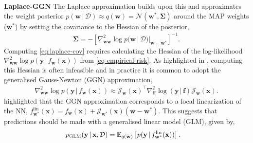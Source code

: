 \documentclass{article}
\newcommand{\weights}{\ensuremath{\mathbf{w}}}
\newcommand{\mbf}[1]{\mathbf{#1}}
\renewcommand{\mid}{\,|\,}
\newcommand{\vf}{\mbf{f}}
\newcommand{\vx}{\mbf{x}}
\newcommand{\vy}{\mbf{y}}
\newcommand{\vw}{\mbf{w}}
\newcommand{\Jac}[2]{\mathcal{J}_{#1}(#2)}
\begin{document}
\textbf{Laplace-GGN}
The Laplace approximation \citet{aa} builds upon this and approximates the weight posterior $p(\vw \mid \mathcal{D}) \approx q(\vw)= \mathcal{N}(\vw^{*} , \bm\Sigma)$
around the MAP weights ($\vw^{*}$) by setting the covariance to the Hessian of the posterior,
\begin{align} \label{eq:laplace-cov}
 \bm\Sigma = - \left[\nabla^{2}_{\vw\vw} \log p(\vw \mid \mathcal{D})  |_{\vw=\vw^{*}} \right]^{-1}.
\end{align}
Computing \cref{eq:laplace-cov} requires calculating the Hessian of the log-likelihood $\nabla^{2}_{\vw\vw} \log p(\vy \mid f_{\vw}(\vx))$ from \cref{eq-empirical-risk}.
As highlighted in \citet{immer2021improving}, computing this Hessian is often infeasible and in practice it is common to adopt the
generalised Gauss-Newton (GGN) approximation,
\begin{align}
 \nabla^{2}_{\vw\vw} \log p(\vy \mid f_{\vw}(\vx)) \approx \Jac{\vw}{\vx}^{\top} \nabla_{\vf\vf}^{2}\log(\vy\mid\vf) \Jac{\vw}{\vx}.
  \nonumber
\end{align}
\citet{immer2021improving} highlighted that the GGN approximation corresponds to a local linearization of the NN,
$f_{\weights^{*}}^{\text{lin}}(\vx) = f_{\weights}(\vx) + \Jac{\weights^{*}}{\vx}(\weights-\weights^{*})$.
This suggests that predictions should be made with a generalised linear model (GLM), given by,
\begin{align} \label{eq-glm}
  p_{\text{\sc GLM}}(\vy \mid \vx, \mathcal{D}) &= \E_{q(\vw)} \left[ p(\vy \mid f_{\vw^{*}}^{\text{lin}}(\vx))\right]. %
\end{align}
\end{document}
